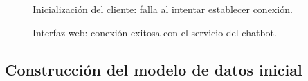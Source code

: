 \begin{figure}
    \centering
    \caption{Inicialización del cliente: falla al intentar establecer conexión.}
    \label{fig:interfaz-web-falla}
\end{figure}

\begin{figure}
    \centering
    \caption{Interfaz web: conexión exitosa con el servicio del chatbot.}
    \label{fig:interfaz-web-exito}
\end{figure}

\subsection{Construcción del modelo de datos inicial}

